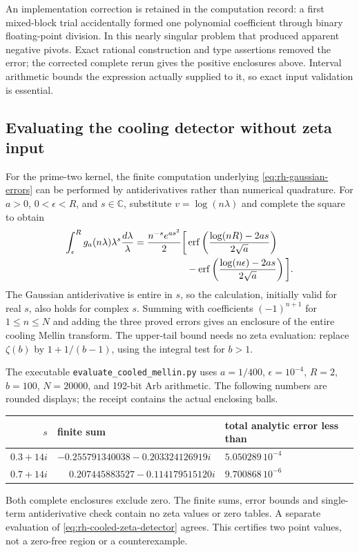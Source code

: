 An implementation correction is retained in the computation record:
a first mixed-block trial accidentally formed one polynomial coefficient
through binary floating-point division. In this nearly singular problem
that produced apparent negative pivots. Exact rational construction and
type assertions removed the error; the corrected complete rerun gives
the positive enclosures above. Interval arithmetic bounds the expression
actually supplied to it, so exact input validation is essential.

\subsection{Evaluating the cooling detector without zeta input}
\label{sec:rh-cooled-evaluation}

For the prime-two kernel, the finite computation underlying
\eqref{eq:rh-gaussian-errors} can be performed by antiderivatives rather
than numerical quadrature. For $a>0$, $0<\epsilon<R$, and $s\in\mathbb C$,
substitute $v=\log(n\lambda)$ and complete the square to obtain
\begin{align}
 \int_\epsilon^R g_a(n\lambda)\lambda^s\frac{d\lambda}{\lambda}
 =\frac{n^{-s}e^{as^2}}2\bigg[
 &\operatorname{erf}\left(\frac{\log(nR)-2as}{2\sqrt a}\right)\notag\\
 &-\operatorname{erf}\left(\frac{\log(n\epsilon)-2as}{2\sqrt a}\right)
 \bigg].
 \label{eq:rh-gaussian-antiderivative}
\end{align}
The Gaussian antiderivative is entire in $s$, so the calculation, initially
valid for real $s$, also holds for complex $s$. Summing with coefficients
$(-1)^{n+1}$ for $1\le n\le N$ and adding the three proved errors gives
an enclosure of the entire cooling Mellin transform.
The upper-tail bound needs no zeta evaluation: replace $\zeta(b)$ by
$1+1/(b-1)$, using the integral test for $b>1$.

The executable \texttt{evaluate\_cooled\_mellin.py} uses
$a=1/400$, $\epsilon=10^{-4}$, $R=2$, $b=100$, $N=20000$,
and 192-bit Arb arithmetic. The following numbers are rounded displays;
the receipt contains the actual enclosing balls.
\begin{center}
\begin{tabular}{rll}
\toprule
$s$ & finite sum & total analytic error less than\\
\midrule
$0.3+14i$ & $-0.255791340038-0.203324126919i$ & $5.050289\,10^{-4}$\\
$0.7+14i$ & $\phantom{-}0.207445883527-0.114179515120i$ & $9.700868\,10^{-6}$\\
\bottomrule
\end{tabular}
\end{center}
Both complete enclosures exclude zero. The finite sums, error bounds and
single-term antiderivative check contain no zeta values or zero tables.
A separate evaluation of \eqref{eq:rh-cooled-zeta-detector} agrees.
This certifies two point values, not a zero-free region or a counterexample.

